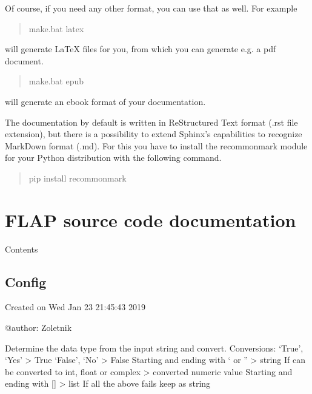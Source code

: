 \documentclass[letterpaper,10pt,english]{sphinxmanual}
\begin{document}
Of course, if you need any other format, you can use that as well. For example
\begin{quote}

make.bat latex
\end{quote}

will generate LaTeX files for you, from which you can generate e.g. a pdf document.
\begin{quote}

make.bat epub
\end{quote}

will generate an ebook format of your documentation.

The documentation by default is written in ReStructured Text format (.rst file extension), but there is a possibility to extend Sphinx’s capabilities to recognize MarkDown format (.md). For this you have to install the recommonmark module for your Python distribution with the following command.
\begin{quote}

pip install recommonmark
\end{quote}


\chapter{FLAP source code documentation}
\label{\detokenize{sourcecode:flap-source-code-documentation}}\label{\detokenize{sourcecode::doc}}
Contents


\section{Config}
\label{\detokenize{config:module-flap.config}}\label{\detokenize{config:config}}\label{\detokenize{config::doc}}
Created on Wed Jan 23 21:45:43 2019

@author: Zoletnik

\begin{fulllineitems}
\label{\detokenize{config:flap.config.interpret_config_value}}
Determine the data type from the input string and convert.
Conversions:
‘True’, ‘Yes’ \textendash{}\textgreater{} True
‘False’, ‘No’ \textendash{}\textgreater{} False
Starting and ending with ‘ or ” \textendash{}\textgreater{} string
If can be converted to int, float or complex \textendash{}\textgreater{} converted numeric value
Starting and ending with {[}{]} \textendash{}\textgreater{} list
If all the above fails keep as string

\end{fulllineitems}
\end{document}

